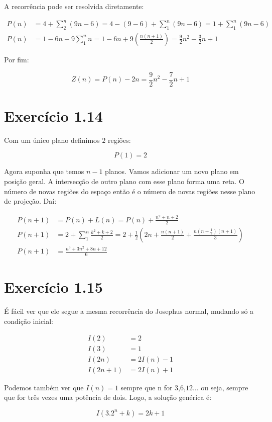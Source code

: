 \documentclass[10pt]{book}
\begin{document}
 A recorrência pode ser resolvida diretamente: 

\begin{align*}
 P(n)&=4+\displaystyle\sum_2^n(9n-6)=4-(9-6)+\sum_1^n(9n-6)=1+\sum_1^n(9n-6) \\
 P(n)&=1-6n+9\displaystyle\sum_1^nn=1-6n+9\left(\frac{n(n+1)}{2}\right)=\frac{9}{2}n^2-\frac{3}{2}n+1 
\end{align*}

 Por fim:

\[ Z(n)=P(n)-2n=\frac{9}{2}n^2-\frac{7}{2}n+1 \]

\section{  Exercício 1.14 }

Com um único plano definimos $2$ regiões:

\[ P(1)=2 \]

Agora suponha que temos $n-1$ planos. Vamos adicionar um novo plano em posição geral. A intersecção de outro plano com esse plano forma uma reta. O número de novas regiões do espaço então é o número de novas regiões nesse plano de projeção. Daí: 

\begin{align*}
 P(n+1)&=P(n)+L(n)=P(n)+\frac{n^2+n+2}{2} \\
 P(n+1)&=2+\sum_1^n\frac{k^2+k+2}{2}=2+\frac{1}{2}\left(2n+\frac{n(n+1)}{2}+\frac{n\left(n+\frac{1}{2}\right)(n+1)}{3}\right)  \\
 P(n+1)&=\frac{n^3+3n^2+8n+12}{6} 
\end{align*}

\section{  Exercício 1.15 }

É fácil ver que ele segue a mesma recorrência do Josephus normal, mudando só a condição inicial:

\begin{align*}
  I(2)&=2 \\
  I(3)&=1 \\
  I(2n)&=2I(n)-1 \\
  I(2n+1)&=2I(n)+1
\end{align*}

Podemos também ver que $I(n)=1$ sempre que n for $3$,$6$,$12$... ou seja, sempre que for três vezes uma potência de dois. Logo, a solução genérica é:

\[ I(3.2^n+k)=2k+1 \]
\end{document}
